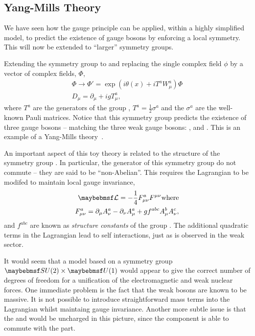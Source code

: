 \subsection{Yang-Mills Theory}
We have seen how the gauge principle can be applied, within a highly simplified
model, to predict the existence of gauge bosons by enforcing a local
symmetry. This will now be extended to ``larger'' symmetry groups.

Extending the symmetry group to \SUtwo and replacing the single complex field
$\phi$ by a vector of complex fields, $\Phi$,
\begin{eqnarray*}
\Phi \longrightarrow \Phi' = \exp\left(i\theta(x) + iT^a W^a_{\mu}\right)\Phi\\
D_{\mu} = \partial_{\mu} + igT^a_{\mu},
\end{eqnarray*}
where $T^a$ are the generators of the group \SUtwo, $T^a = \frac{1}{2}\sigma^a$
and the $\sigma^a$ are the well-known Pauli matrices. Notice that this symmetry
group predicts the existence of three gauge bosons -- matching the three weak
gauge bosons: \PZ, \PWp and \PWm. This is an example of a Yang-Mills
theory~\cite{yangmills}.

An important aspect of this toy theory is related to the structure of the
symmetry group \SUtwo. In particular, the generator of this symmetry group do
not commute -- they are said to be ``non-Abelian''. This requires the Lagrangian
to be modifed to maintain local gauge invariance,
\begin{eqnarray*}
\lagrangiand = -\frac{1}{4}F^a_{\mu\nu}F^{\mu\nu} \textrm{where}\\
F^a_{\mu\nu} = \partial_{\mu} A^a_{\nu} - \partial_{\nu} A^a_{\mu} + g f^{abc}
A^b_{\mu} A^c_{\nu},
\end{eqnarray*}
and $f^{abc}$ are known as \emph{structure constants} of the group \SUtwo. The
additional quadratic terms in the Lagrangian lead to self interactions, just as
is observed in the weak sector.

It would seem that a model based on a symmetry group $\SUtwo\times\Uone$ would
appear to give the correct number of degrees of freedom for a unification of the
electromagnetic and weak nuclear forces. One immediate problem is the fact that
the weak bosons are known to be massive. It is not possible to introduce
straightforward mass terms into the Lagrangian whilst maintaing gauge
invariance. Another more subtle issue is that the \PWp and \PWm would be
uncharged in this picture, since the \SUtwo component is able to commute with
the \Uone part. %

